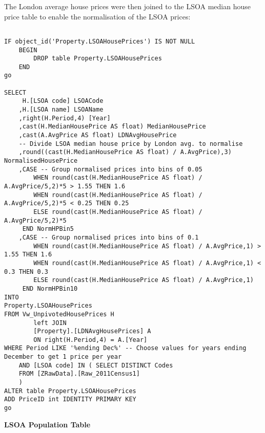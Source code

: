 \documentclass{article}
\begin{document}
The London average house prices were then joined to the LSOA median house price table to enable the normalisation of the LSOA prices:
\begin{lstlisting}

IF object_id('Property.LSOAHousePrices') IS NOT NULL 
	BEGIN 
		DROP table Property.LSOAHousePrices
	END
go

SELECT
	 H.[LSOA code] LSOACode
	,H.[LSOA name] LSOAName
	,right(H.Period,4) [Year]
	,cast(H.MedianHousePrice AS float) MedianHousePrice
	,cast(A.AvgPrice AS float) LDNAvgHousePrice
	-- Divide LSOA median house price by London avg. to normalise
	,round((cast(H.MedianHousePrice AS float) / A.AvgPrice),3) NormalisedHousePrice
	,CASE -- Group normalised prices into bins of 0.05
		WHEN round(cast(H.MedianHousePrice AS float) / A.AvgPrice/5,2)*5 > 1.55 THEN 1.6
		WHEN round(cast(H.MedianHousePrice AS float) / A.AvgPrice/5,2)*5 < 0.25 THEN 0.25
		ELSE round(cast(H.MedianHousePrice AS float) / A.AvgPrice/5,2)*5
	 END NormHPBin5
	,CASE -- Group normalised prices into bins of 0.1
		WHEN round(cast(H.MedianHousePrice AS float) / A.AvgPrice,1) > 1.55 THEN 1.6
		WHEN round(cast(H.MedianHousePrice AS float) / A.AvgPrice,1) <    0.3 THEN 0.3
		ELSE round(cast(H.MedianHousePrice AS float) / A.AvgPrice,1)
	 END NormHPBin10
INTO 
Property.LSOAHousePrices 
FROM Vw_UnpivotedHousePrices H
		left JOIN 
		[Property].[LDNAvgHousePrices] A
		ON right(H.Period,4) = A.[Year]
WHERE Period LIKE '%ending Dec%' -- Choose values for years ending December to get 1 price per year
	AND [LSOA code] IN ( SELECT DISTINCT Codes 
	FROM [ZRawData].[Raw_2011Census1]
	)
ALTER table Property.LSOAHousePrices
ADD PriceID int IDENTITY PRIMARY KEY
go

\end{lstlisting}
\bigskip

\noindent
\textbf{LSOA Population Table}
\end{document}
